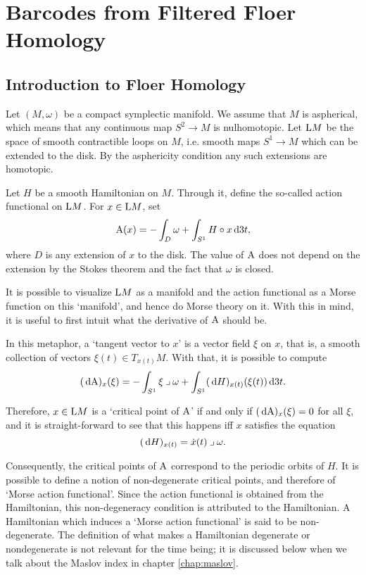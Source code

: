 \chapter{Barcodes from Filtered Floer Homology}\label{chap:bffh}

\section{Introduction to Floer Homology}

Let $(M, \omega)$ be a compact symplectic manifold. We assume that $M$ is aspherical, which means that any continuous map $S^2 \to M$ is nulhomotopic. Let $\LL M$ be the space of smooth contractible loops on $M$, i.e. smooth maps $S^1 \to M$ which can be extended to the disk. By the asphericity condition any such extensions are homotopic.

Let $H$ be a smooth Hamiltonian on $M$. Through it, define the so-called action functional on $\LL M$. For $x \in \LL M$, set
\begin{equation}\label{eq:defaction}
\AA(x) = - \int_D \omega + \int_{S^1} H \circ x \dl3 t,
\end{equation}
where $D$ is any extension of $x$ to the disk. The value of $\AA$ does not depend on the extension by the Stokes theorem and the fact that $\omega$ is closed.

It is possible to visualize $\LL M$ as a manifold and the action functional as a Morse function on this `manifold', and hence do Morse theory on it. With this in mind, it is useful to first intuit what the derivative of $\AA$ should be.

In this metaphor, a `tangent vector to $x$' is a vector field $\xi$ on $x$, that is, a smooth collection of vectors $\xi(t) \in T_{x(t)} M$. With that, it is possible to compute
\begin{equation}
 (\dl \AA)_x(\xi) = - \int_{S^1} \xi \into \omega + \int_{S^1} (\dl H)_{x(t)} (\xi(t)) \dl3t. 
\end{equation}

Therefore, $x\in \LL M$ is a `critical point of $\AA$' if and only if $(\dl \AA)_x(\xi) = 0$ for all $\xi$, and it is straight-forward to see that this happens iff $x$ satisfies the equation
\begin{equation}
(\dl H)_{x(t)} = \dot x(t) \into \omega.
\end{equation}

Consequently, the critical points of $\AA$ correspond to the periodic orbits of $H$. It is possible to define a notion of non-degenerate critical points, and therefore of `Morse action functional'. Since the action functional is obtained from the Hamiltonian, this non-degeneracy condition is attributed to the Hamiltonian. A Hamiltonian which induces a `Morse action functional' is said to be non-degenerate. The definition of what makes a Hamiltonian degenerate or nondegenerate is not relevant for the time being; it is discussed below when we talk about the Maslov index in chapter \ref{chap:maslov}.

